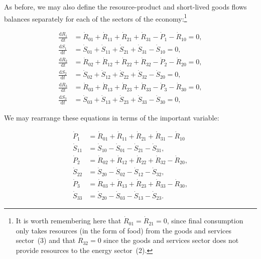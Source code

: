 As before,
we may also define the resource-product
and short-lived goods flows balances separately
for each of the sectors of the economy:\footnote{It
is worth remembering here that 
$\dot{R}_{01} = \dot{R}_{21} = 0$,
since final consumption only takes resources
(in the form of food) from the goods and services
sector~(3) and that $R_{32} = 0$ since
the goods and services sector does not provide
resources to the energy sector~(2).}

\begin{align}
	\frac{\mathrm{d}R_{1}}{\mathrm{d}t} 	&
	= \dot{R}_{01}
	+ \dot{R}_{11}
	+ \dot{R}_{21}
	+ \dot{R}_{31}
	- \dot{P}_{1}
	- \dot{R}_{10}
	= 0,															\\
\label{eq:C_dS1}
	\frac{\mathrm{d}S_{1}}{\mathrm{d}t} 	&
	= \dot{S}_{01}
	+ \dot{S}_{11}
	+ \dot{S}_{21}
	+ \dot{S}_{31}
	- \dot{S}_{10}
	= 0,															\\
	\frac{\mathrm{d}R_{2}}{\mathrm{d}t} 	&
	= \dot{R}_{02}
	+ \dot{R}_{12}
	+ \dot{R}_{22}
	+ \dot{R}_{32}
	- \dot{P}_{2}
	- \dot{R}_{20}
	= 0,															\\
\label{eq:C_dS2}
	\frac{\mathrm{d}S_{2}}{\mathrm{d}t} 	&
	= \dot{S}_{02}
	+ \dot{S}_{12}
	+ \dot{S}_{22}
	+ \dot{S}_{32}
	- \dot{S}_{20}
	= 0,															\\
	\frac{\mathrm{d}R_{3}}{\mathrm{d}t} 	&
	= \dot{R}_{03}
	+ \dot{R}_{13}
	+ \dot{R}_{23}
	+ \dot{R}_{33}
	- \dot{P}_{3}
	- \dot{R}_{30}
	= 0,															\\
\label{eq:C_dS3}
	\frac{\mathrm{d}S_{3}}{\mathrm{d}t} 	&
	= \dot{S}_{03}
	+ \dot{S}_{13}
	+ \dot{S}_{23}
	+ \dot{S}_{33}
	- \dot{S}_{30}
	= 0,
\end{align}

We may rearrange these equations
in terms of the important variable:

\begin{align}
\label{eq:C_P1a}
	\dot{P}_{1}												&
	= \dot{R}_{01}
	+ \dot{R}_{11}
	+ \dot{R}_{21}
	+ \dot{R}_{31}
	- \dot{R}_{10}											\\
\label{eq:C_S11}
	\dot{S}_{11}											&
	= \dot{S}_{10}
	- \dot{S}_{01}
	- \dot{S}_{21}
	- \dot{S}_{31},										\\
\label{eq:C_P2a}
	\dot{P}_{2}												&
	= \dot{R}_{02}
	+ \dot{R}_{12}
	+ \dot{R}_{22}
	+ \dot{R}_{32}
	- \dot{R}_{20},										\\
\label{eq:C_S22}
	\dot{S}_{22}											&
	= \dot{S}_{20}
	- \dot{S}_{02} 
	- \dot{S}_{12}
	- \dot{S}_{32},										\\
\label{eq:C_P3a}
	\dot{P}_{3}												&
	= \dot{R}_{03}
	+ \dot{R}_{13}
	+ \dot{R}_{23}
	+ \dot{R}_{33}
	- \dot{R}_{30},										\\
\label{eq:C_S33}
	\dot{S}_{33}											&
	= \dot{S}_{20}
	- \dot{S}_{03}
	- \dot{S}_{13}
	- \dot{S}_{23}.	
\end{align}

